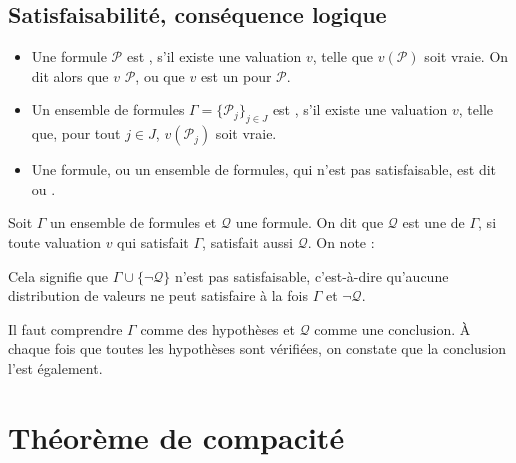 \documentclass[11pt,class=report,crop=false]{standalone}
\begin{document}
\subsection{Satisfaisabilité, conséquence logique}

\begin{definition}
	\sauteligne
	\begin{itemize}
		\item Une formule $\mathcal{P}$ est , s'il existe une valuation $v$, telle que $v(\mathcal{P})$ soit vraie. On dit alors que $v$  $\mathcal{P}$, ou que $v$ est un  pour $\mathcal{P}$.
		
		\item Un ensemble de formules $\Gamma = \{ \mathcal{P}_j \}_{j \in J}$ est , s'il existe une valuation $v$, telle que, pour tout $j \in J$, $v(\mathcal{P}_j)$ soit vraie. 
		
		\item Une formule, ou un ensemble de formules, qui n'est pas satisfaisable, est dit  ou .
	\end{itemize}
\end{definition}	

\begin{definition}
	Soit $\Gamma$ un ensemble de formules et $\mathcal{Q}$ une formule.
	On dit que $\mathcal{Q}$ est une  de $\Gamma$, si toute valuation $v$ qui satisfait $\Gamma$, satisfait aussi $\mathcal{Q}$.
	On note :
\end{definition}

Cela signifie que $\Gamma \cup \{ \lnot \mathcal{Q} \}$ n'est pas satisfaisable, c'est-à-dire qu'aucune distribution de valeurs ne peut satisfaire à la fois $\Gamma$ et $\lnot \mathcal{Q}$.

Il faut comprendre $\Gamma$ comme des hypothèses et $\mathcal{Q}$ comme une conclusion. À chaque fois que toutes les hypothèses sont vérifiées, on constate que la conclusion l'est également.



\section{Théorème de compacité}
\end{document}

